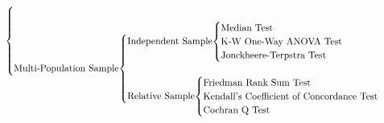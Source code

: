 \[{\begin{cases}
            \\
            \\
        \text{Multi-Population Sample}
            \smash[b]{
                \begin{cases}
                    \text{Independent Sample}
                    \smash[t]{
                        \begin{cases}
                            \text{Median Test}\\
                            \text{K-W One-Way ANOVA Test}\\
                            \text{Jonckheere-Terpstra Test}
                        \end{cases}
                    }\\
                    \\
                    \text{Relative Sample}
                    \smash[b]{
                        \begin{cases}
                            \text{Friedman Rank Sum Test}\\
                            \text{Kendall's Coefficient of Concordance Test}\\
                            \text{Cochran Q Test}
                        \end{cases}
                    }
                \end{cases}
            }
    \end{cases}  
    }
\]
